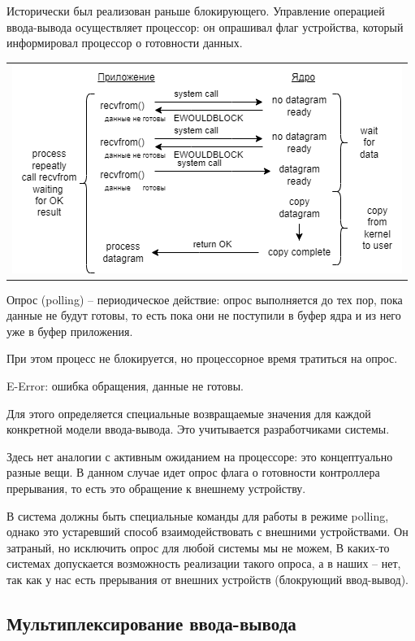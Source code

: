 Исторически был реализован раньше блокирующего. Управление операцией ввода-вывода осуществляет процессор: он опрашивал флаг устройства, который информировал процессор о готовности данных.
\begin{table}[H]
  \centering
  \begin{tabular}{p{1\linewidth}}
    \centering
    \includegraphics[width=0.8\linewidth]{./images/1-2.png}
  \end{tabular}
\end{table}

Опрос (polling) – периодическое действие: опрос выполняется до тех пор, пока данные не будут готовы, то есть пока они не поступили в буфер ядра и из него уже в буфер приложения.

При этом процесс не блокируется, но процессорное время тратиться на опрос. 

E-Error: ошибка обращения, данные не готовы.

Для этого определяется специальные возвращаемые значения для каждой конкретной модели ввода-вывода. Это учитывается разработчиками системы.

Здесь нет аналогии с активным ожиданием на процессоре: это концептуально разные вещи. В данном случае идет опрос флага о готовности контроллера прерывания, то есть это обращение к внешнему устройству.

В система должны быть специальные команды для работы в режиме polling, однако это устаревший способ взаимодействовать с внешними устройствами. Он затраный, но исключить опрос для любой системы мы не можем, В каких-то системах допускается возможность реализации такого опроса, а в наших – нет, так как у нас есть прерывания от внешних устройств (блокрующий ввод-вывод).

\subsection{Мультиплексирование ввода-вывода}

